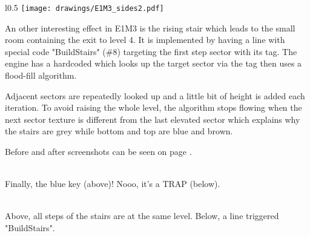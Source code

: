 \par
\begin{wrapfigure}[23]{l}{0.5\textwidth}
\centering
\texttt{[image: drawings/E1M3\_sides2.pdf]}
\end{wrapfigure}
An other interesting effect in E1M3 is the rising stair which leads to the small room containing the exit to level 4. It is implemented by having a line with special code "BuildStairs" (\#8) targeting the first step sector with its tag. The engine has a hardcoded  which looks up the target sector via the tag then uses a flood-fill algorithm.\\
\par Adjacent sectors are repeatedly looked up and a little bit of height is added each iteration. To avoid raising the whole level, the algorithm stops flowing when the next sector texture is different from the last elevated sector which explains why the stairs are grey while bottom and top are blue and brown.\\
\par
Before and after screenshots can be seen on page \pageref{stairs}.


 \label{e1m3_trap} \\
Finally, the blue key (above)! Nooo, it's a TRAP (below).

\vspace{2mm}
 \label{stairs} \\
Above, all steps of the stairs are at the same level. Below, a line triggered "BuildStairs". 

\vspace{2mm}



